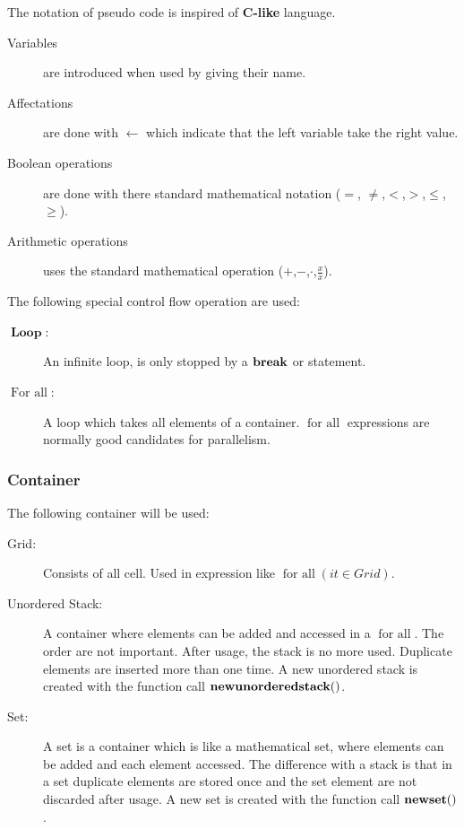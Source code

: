 The notation of pseudo code is inspired of \textbf{C-like} language.

\begin{description}
 \item[Variables] are introduced when used by giving their name.
\item[Affectations] are done with $\gets$ which indicate that the left variable take the right value.
\item[Boolean operations] are done with there standard mathematical notation ($=$, $\neq$,$<$,$>$,$\leq$,$\geq$).
\item[Arithmetic operations] uses the standard mathematical operation ($+$,$-$,$\cdot$,$\frac{x}{x}$).
\end{description}

The following special control flow operation are used:
\begin{description}
 \item[$\mathop{\textbf{Loop}}$:] An infinite loop, is only stopped by a $\mathop{\textbf{break}}$ or \Return statement.
 \item[$\mathop{\textbf{For all}}$:] A loop which takes all elements of a container.
 $\mathop{\textbf{for all}}$ expressions are normally good candidates for parallelism.
\end{description}

\subsubsection{Container}

The following container will be used:
\begin{description}
 \item[Grid:] Consists of all cell. Used in expression like $\mathop{\textbf{for all}}(it \in Grid)$.
 \item[Unordered Stack:] A container where elements can be added and accessed in a $\mathop{\textbf{for all}}$. The order are not important.
 After usage, the stack is no more used. Duplicate elements are inserted more than one time.
 A new unordered stack is created with the function call $\mathop{\textbf{newunorderedstack}}()$.
 \item[Set:] A set is a container which is like a mathematical set, where elements can be added and each element accessed.
 The difference with a stack is that in a set duplicate elements are stored once and the set element are not discarded after usage.
 A new set is created with the function call $\mathop{\textbf{newset}}()$.
\end{description}

